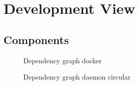 
\section{Development View}
\label{sec:viewdevelopment}

\subsection{Components}

\begin{figure}[H]
\centering
\begin{center}
\end{center}
\caption{Dependency graph docker}
\label{fig:dependency}
\end{figure}

\begin{figure}[H]
\centering
\begin{center}
\end{center}
\caption{Dependency graph daemon circular}
\label{fig:dependency}
\end{figure}

